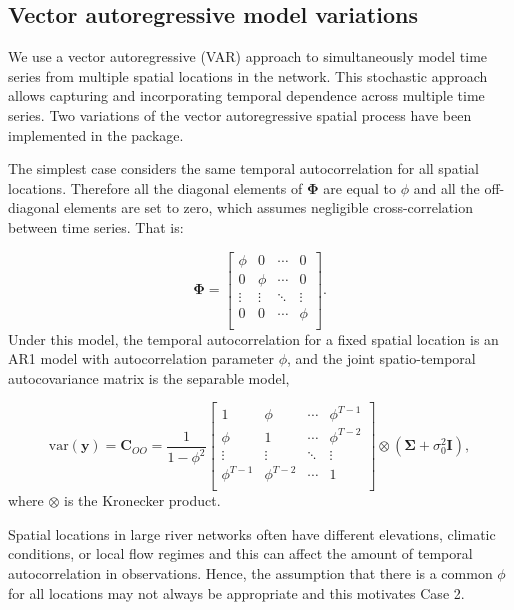 \subsection {Vector autoregressive model variations}
\label{sec:dst}

We use a vector autoregressive (VAR) approach to simultaneously model time series from multiple spatial locations in the network. This stochastic approach allows capturing and incorporating temporal dependence across multiple time series.  
Two variations of the vector autoregressive spatial process have been implemented in the  package.


\noindent The simplest case considers the same temporal autocorrelation for all spatial locations. Therefore all the diagonal elements of $\pmb{\Phi}$ are equal to $\phi$ and all the off-diagonal elements are set to zero, which assumes negligible cross-correlation between time series. That is:

\begin{equation}\label{eq:case1}
\pmb{\Phi} = \begin{bmatrix}
\phi & 0 & \cdots & 0 \\ 
0 & \phi &  \cdots  & 0 \\ 
\vdots & \vdots &  \ddots & \vdots \\ 
0 & 0  & \cdots & \phi \\
\end{bmatrix}.
\end{equation}
Under this model, the temporal autocorrelation for a fixed spatial location is an AR1 model with autocorrelation parameter $\phi$, and the joint spatio-temporal autocovariance matrix is the separable model,

\begin{equation}\label{eq:separable}
\textrm{var}({\mathbf{y}}) = \pmb{C}_{OO} =
\frac{1}{1 - \phi^2}\begin{bmatrix}
1 & \phi & \cdots & \phi^{T-1} \\ 
\phi & 1 &  \cdots  & \phi^{T-2} \\ 
\vdots & \vdots &  \ddots & \vdots \\ 
\phi^{T-1} & \phi^{T-2}  & \cdots & 1 \\
\end{bmatrix} \otimes (\pmb{\Sigma} + \sigma^2_0\pmb{I}),
\end{equation}
where $\otimes$ is the Kronecker product. 

Spatial locations in large river networks often have different elevations, climatic conditions, or local flow regimes and this can affect the amount of temporal autocorrelation in observations. Hence, the assumption that there is a common $\phi$ for all locations may not always be appropriate and this motivates Case 2.

